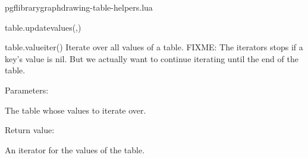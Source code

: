 \begin{filedescription}{pgflibrarygraphdrawing-table-helpers.lua}
\begin{luacommand}{{table.update\textunderscore{}values}(,)}
\end{luacommand}
\begin{luacommand}{{table.value\textunderscore{}iter}()}
Iterate over all values of a table.  FIXME: The iterators stops if a key's value is nil. But we actually want to continue iterating until the end of the table. 

Parameters:
\begin{parameterdescription}
	\item[\meta{table}] The table whose values to iterate over. 
\end{parameterdescription}


Return value:
\begin{parameterdescription} 
  \item[] An iterator for the values of the table. 
\end{parameterdescription}


\end{luacommand}

\end{filedescription}